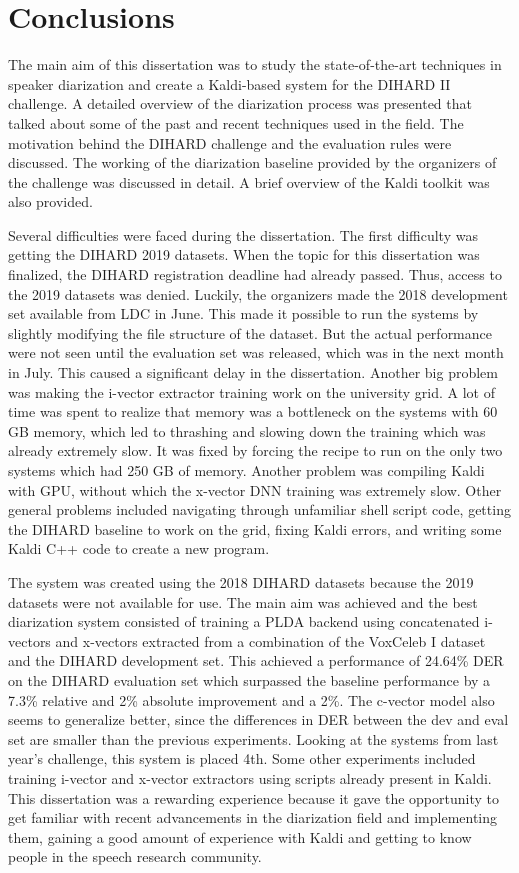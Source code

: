 \chapter{Conclusions}
The main aim of this dissertation was to study the state-of-the-art techniques in speaker diarization and create a Kaldi-based system for the DIHARD II challenge. A detailed overview of the diarization process was presented that talked about some of the past and recent techniques used in the field. The motivation behind the DIHARD challenge and the evaluation rules were discussed. The working of the diarization baseline provided by the organizers of the challenge was discussed in detail. A brief overview of the Kaldi toolkit was also provided.

Several difficulties were faced during the dissertation. The first difficulty was getting the DIHARD 2019 datasets. When the topic for this dissertation was finalized, the DIHARD registration deadline had already passed. Thus, access to the 2019 datasets was denied. Luckily, the organizers made the 2018 development set available from LDC in June. This made it possible to run the systems by slightly modifying the file structure of the dataset. But the actual performance were not seen until the evaluation set was released, which was in the next month in July. This caused a significant delay in the dissertation. Another big problem was making the i-vector extractor training work on the university grid. A lot of time was spent to realize that memory was a bottleneck on the systems with 60 GB memory, which led to thrashing and slowing down the training which was already extremely slow. It was fixed by forcing the recipe to run on the only two systems which had 250 GB of memory. Another problem was compiling Kaldi with GPU, without which the x-vector DNN training was extremely slow. Other general problems included navigating through unfamiliar shell script code, getting the DIHARD baseline to work on the grid, fixing Kaldi errors, and writing some Kaldi C++ code to create a new program.

The system was created using the 2018 DIHARD datasets because the 2019 datasets were not available for use. The main aim was achieved and the best diarization system consisted of training a PLDA backend using concatenated i-vectors and x-vectors extracted from a combination of the VoxCeleb I dataset and the DIHARD development set. This achieved a performance of 24.64\% DER on the DIHARD evaluation set which  surpassed the baseline performance by a 7.3\% relative and 2\% absolute improvement and a 2\%. The c-vector model also seems to generalize better, since the differences in DER between the dev and eval set are smaller than the previous experiments. Looking at the systems from last year's challenge, this system is placed 4th. Some other experiments included training i-vector and x-vector extractors using scripts already present in Kaldi. This dissertation was a rewarding experience because it gave the opportunity to get familiar with recent advancements in the diarization field and implementing them, gaining a good amount of experience with Kaldi and getting to know people in the speech research community.
